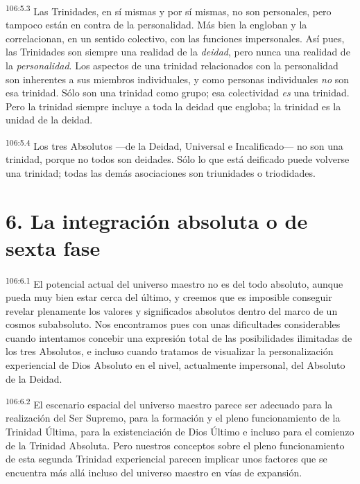 \par
\textsuperscript{106:5.3} Las Trinidades, en sí mismas y por sí mismas, no son personales, pero tampoco están en contra de la personalidad. Más bien la engloban y la correlacionan, en un sentido colectivo, con las funciones impersonales. Así pues, las Trinidades son siempre una realidad de la \textit{deidad}, pero nunca una realidad de la \textit{personalidad}. Los aspectos de una trinidad relacionados con la personalidad son inherentes a sus miembros individuales, y como personas individuales \textit{no} son esa trinidad. Sólo son una trinidad como grupo; esa colectividad \textit{es} una trinidad. Pero la trinidad siempre incluye a toda la deidad que engloba; la trinidad es la unidad de la deidad.

\par
\textsuperscript{106:5.4} Los tres Absolutos ---de la Deidad, Universal e Incalificado--- no son una trinidad, porque no todos son deidades. Sólo lo que está deificado puede volverse una trinidad; todas las demás asociaciones son triunidades o triodidades.

\section*{6. La integración absoluta o de sexta fase}
\par
\textsuperscript{106:6.1} El potencial actual del universo maestro no es del todo absoluto, aunque pueda muy bien estar cerca del último, y creemos que es imposible conseguir revelar plenamente los valores y significados absolutos dentro del marco de un cosmos subabsoluto. Nos encontramos pues con unas dificultades considerables cuando intentamos concebir una expresión total de las posibilidades ilimitadas de los tres Absolutos, e incluso cuando tratamos de visualizar la personalización experiencial de Dios Absoluto en el nivel, actualmente impersonal, del Absoluto de la Deidad.

\par
\textsuperscript{106:6.2} El escenario espacial del universo maestro parece ser adecuado para la realización del Ser Supremo, para la formación y el pleno funcionamiento de la Trinidad Última, para la existenciación de Dios Último e incluso para el comienzo de la Trinidad Absoluta. Pero nuestros conceptos sobre el pleno funcionamiento de esta segunda Trinidad experiencial parecen implicar unos factores que se encuentra más allá incluso del universo maestro en vías de expansión.

